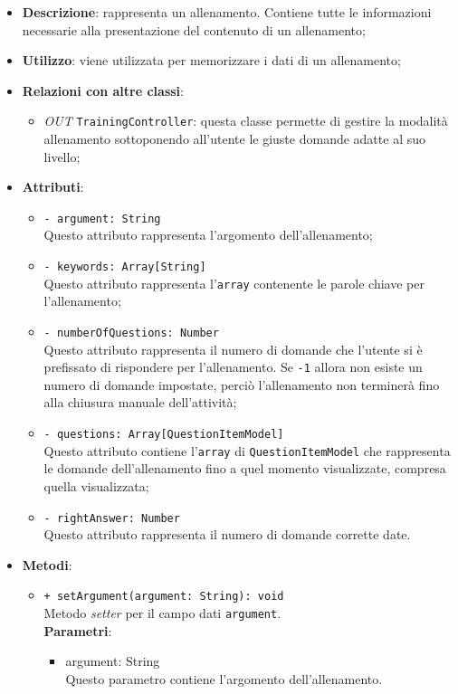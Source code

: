 		\begin{itemize}
			\item \textbf{Descrizione}: rappresenta un allenamento. Contiene tutte le informazioni necessarie alla	presentazione del contenuto di un allenamento;
			\item \textbf{Utilizzo}: viene utilizzata per memorizzare i dati di un allenamento;
			\item \textbf{Relazioni con altre classi}: 
			\begin{itemize}
				\item \textit{OUT} \texttt{TrainingController}: questa classe permette di gestire la modalità allenamento sottoponendo all'utente le giuste domande adatte al suo livello;
			\end{itemize}
			\item \textbf{Attributi}: 
			\begin{itemize}
				\item \texttt{- argument: String}\\
				Questo attributo rappresenta l'argomento dell'allenamento;
				\item \texttt{- keywords: Array[String]}\\
				Questo attributo rappresenta l'\texttt{array} contenente le parole chiave per l'allenamento;
				\item \texttt{- numberOfQuestions: Number}\\
				Questo attributo rappresenta il numero di domande che l'utente si è prefissato di rispondere per l'allenamento. Se \texttt{-1} allora non esiste un numero di domande impostate, perciò l'allenamento non terminerà fino alla chiusura manuale dell'attività;
				\item \texttt{- questions: Array[QuestionItemModel]}\\
				Questo attributo contiene l'\texttt{array} di \texttt{QuestionItemModel} che rappresenta le domande dell'allenamento fino a quel momento visualizzate, compresa quella visualizzata;
				\item \texttt{- rightAnswer: Number}\\
				Questo attributo rappresenta il numero di domande corrette date.
			\end{itemize}
			\item \textbf{Metodi}: 
			\begin{itemize}
				\item \texttt{+ setArgument(argument: String): void} \\
				Metodo \textit{setter} per il campo dati \texttt{argument}.\\
				\textbf{Parametri}:
				\begin{itemize}
					\item {argument: String}\\
					Questo parametro contiene l'argomento dell'allenamento.
				\end{itemize}
				

\end{itemize}
\end{itemize}
